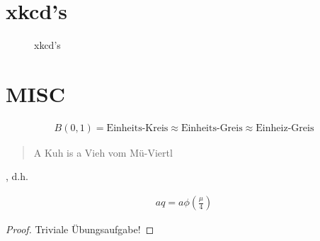 \documentclass{article}
\begin{document}
\section{xkcd's}

\begin{figure}[H]
  \centering
  \hspace{0mm}
  \caption{xkcd's}
  \label{fig:xkcd}
\end{figure}

\section{MISC}

\begin{theorem}

  \begin{align*}
    B(0, 1)
    =
    \text{Einheits-Kreis}
    \approx
    \text{Einheits-Greis}
    \approx
    \text{Einheiz-Greis}
  \end{align*}

\end{theorem}

\begin{theorem}

  \blockquote{A Kuh is a Vieh vom Mü-Viertl}, d.h.

  \begin{align}
    aq = a \phi \left( \frac{\mu}{4} \right)
  \end{align}

\end{theorem}

\begin{proof}
  Triviale Übungsaufgabe!
\end{proof}
\end{document}
